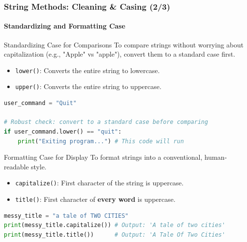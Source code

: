 \documentclass{beamer}
\begin{document}
\begin{frame}[fragile]
    \frametitle{String Methods: Cleaning \& Casing (2/3)}
    \framesubtitle{Standardizing and Formatting Case}

    \begin{block}{Standardizing Case for Comparisons}
    To compare strings without worrying about capitalization (e.g., "Apple" vs "apple"), convert them to a standard case first.
    \begin{itemize}
        \item \texttt{lower()}: Converts the entire string to lowercase.
        \item \texttt{upper()}: Converts the entire string to uppercase.
    \end{itemize}
\begin{lstlisting}[language=Python]
user_command = "Quit"

# Robust check: convert to a standard case before comparing
if user_command.lower() == "quit":
    print("Exiting program...") # This code will run
\end{lstlisting}
    \end{block}

    \begin{block}{Formatting Case for Display}
    To format strings into a conventional, human-readable style.
    \begin{itemize}
        \item \texttt{capitalize()}: First character of the string is uppercase.
        \item \texttt{title()}: First character of \textbf{every word} is uppercase.
    \end{itemize}
\begin{lstlisting}[language=Python]
messy_title = "a tale of TWO CITIES"
print(messy_title.capitalize()) # Output: 'A tale of two cities'
print(messy_title.title())      # Output: 'A Tale Of Two Cities'
\end{lstlisting}
    \end{block}
    
\end{frame}
\end{document}

